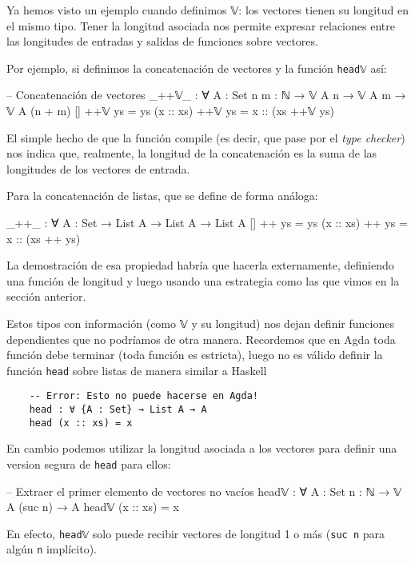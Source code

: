\documentclass[11pt]{article} %
\begin{document}
Ya hemos visto un ejemplo cuando definimos 𝕍: los vectores tienen su longitud en el mismo tipo. Tener la longitud asociada nos permite expresar relaciones entre las longitudes de entradas y salidas de funciones sobre vectores.

Por ejemplo, si definimos la concatenación de vectores y la función \verb|head𝕍| así:

\begin{code}
-- Concatenación de vectores
_++𝕍_ : ∀ {A : Set} {n m : ℕ} → 𝕍 A n → 𝕍 A m → 𝕍 A (n + m)
[] ++𝕍 ys = ys
(x :: xs) ++𝕍 ys = x :: (xs ++𝕍 ys) 
\end{code}

El simple hecho de que la función compile (es decir, que pase por el \textit{type checker}) nos indica que, realmente, la longitud de la concatenación es la suma de las longitudes de los vectores de entrada.

Para la concatenación de listas, que se define de forma análoga:

\begin{code}
_++_ : ∀ {A : Set} → List A → List A → List A
[] ++ ys = ys
(x :: xs) ++ ys = x :: (xs ++ ys) 
\end{code}
    
La demostración de esa propiedad habría que hacerla externamente, definiendo una función de longitud y luego usando una estrategia como las que vimos en la sección anterior.


Estos tipos con información (como 𝕍 y su longitud) nos dejan definir funciones dependientes que no podríamos de otra manera. Recordemos que en Agda toda función debe terminar (toda función es estricta), luego no es válido definir la función \verb|head| sobre listas de manera similar a Haskell

\begin{verbatim}
    -- Error: Esto no puede hacerse en Agda! 
    head : ∀ {A : Set} → List A → A
    head (x :: xs) = x
\end{verbatim}

En cambio podemos utilizar la longitud asociada a los vectores para definir una version segura de \verb|head| para ellos:

\begin{code}
-- Extraer el primer elemento de vectores no vacíos
head𝕍 : ∀ {A : Set} {n : ℕ} → 𝕍 A (suc n) → A
head𝕍 (x :: xs) = x
\end{code}    

En efecto, \verb|head𝕍| solo puede recibir vectores de longitud 1 o más (\verb|suc n| para algún \verb|n| implícito).  
\end{document}
